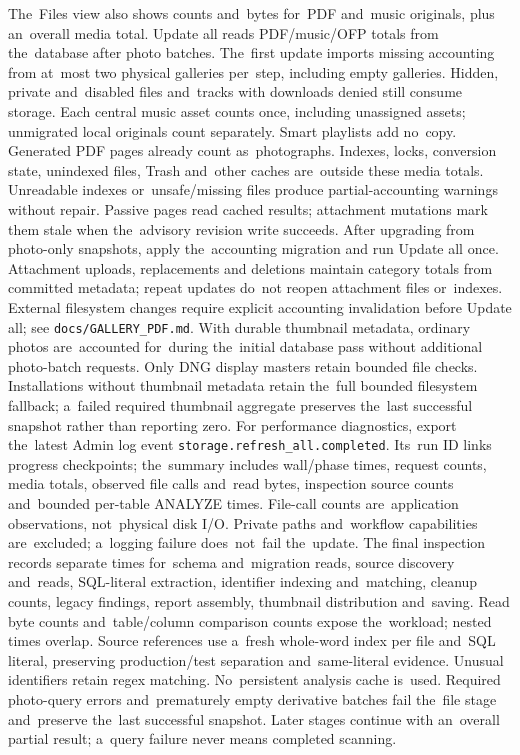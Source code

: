 \documentclass[11pt,a4paper]{article}
\newcommand{\codeword}[1]{\nolinkurl{#1}}
\begin{document}
The~Files view also shows counts and~bytes for~PDF and~music originals,
plus an~overall media total. Update all reads PDF/music/OFP totals from
the~database after photo batches. The~first update imports missing accounting
from at~most two physical galleries per~step, including empty galleries. Hidden,
private and~disabled files and~tracks with downloads denied still consume
storage. Each central music asset counts once, including unassigned assets;
unmigrated local originals count separately. Smart playlists add no~copy.
Generated PDF pages already count as~photographs. Indexes, locks, conversion
state, unindexed files, Trash and~other caches are~outside these media totals.
Unreadable indexes or~unsafe/missing files produce partial-accounting warnings
without repair. Passive pages read cached results; attachment mutations mark
them stale when the~advisory revision write succeeds. After upgrading from
photo-only snapshots, apply the~accounting migration and run Update all once.
Attachment uploads, replacements and deletions maintain category totals from
committed metadata; repeat updates do~not reopen attachment files or~indexes.
External filesystem changes require explicit accounting invalidation before
Update all; see \codeword{docs/GALLERY\_PDF.md}.
With durable thumbnail metadata, ordinary photos are~accounted for~during
the~initial database pass without additional photo-batch requests. Only DNG
display masters retain bounded file checks. Installations without thumbnail
metadata retain the~full bounded filesystem fallback; a~failed required
thumbnail
aggregate preserves the~last successful snapshot rather than reporting zero.
For performance diagnostics, export the~latest Admin log event
\codeword{storage.refresh\_all.completed}. Its~run ID links progress
checkpoints;
the~summary includes wall/phase times, request counts, media totals, observed
file
calls and~read bytes, inspection source counts and~bounded per-table ANALYZE
times.
File-call counts are~application observations, not~physical disk I/O. Private
paths
and~workflow capabilities are~excluded; a~logging failure does~not~fail
the~update.
The final inspection records separate times for~schema and~migration reads,
source discovery and~reads, SQL-literal extraction, identifier indexing
and~matching,
cleanup counts, legacy findings, report assembly, thumbnail distribution
and~saving.
Read byte counts and~table/column comparison counts expose the~workload;
nested times overlap. Source references use a~fresh whole-word index per file
and~SQL literal, preserving production/test separation and~same-literal
evidence.
Unusual identifiers retain regex matching. No~persistent analysis cache is~used.
Required photo-query errors and~prematurely empty derivative batches fail
the~file stage and~preserve the~last successful snapshot. Later stages continue
with an~overall partial result; a~query failure never means completed scanning.
\end{document}
